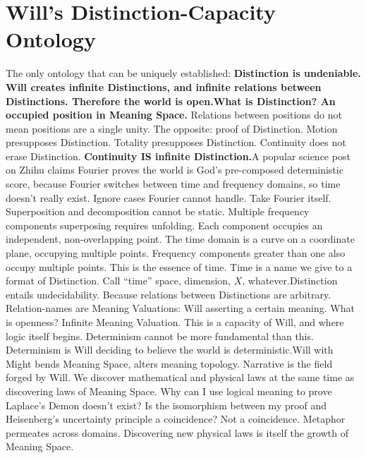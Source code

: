 \documentclass[11pt]{article}
\renewcommand{\\}[1][\mynewlineskip]{\oldnewline[#1]}
\begin{document}
\section{Will's Distinction-Capacity Ontology}
The only ontology that can be uniquely established:\textbf{ Distinction is undeniable. Will creates infinite Distinctions, and infinite relations between Distinctions. Therefore the world is open.}\\
\textbf{What is Distinction? An occupied position in Meaning Space.} Relations between positions do not mean positions are a single unity. The opposite: proof of Distinction. Motion presupposes Distinction. Totality presupposes Distinction. Continuity does not erase Distinction. \textbf{Continuity IS infinite Distinction.}\\
A popular science post on Zhihu claims Fourier proves the world is God's pre-composed deterministic score, because Fourier switches between time and frequency domains, so time doesn't really exist. Ignore cases Fourier cannot handle. Take Fourier itself. Superposition and decomposition cannot be static. Multiple frequency components superposing requires unfolding. Each component occupies an independent, non-overlapping point. The time domain is a curve on a coordinate plane, occupying multiple points. Frequency components greater than one also occupy multiple points. This is the essence of time. Time is a name we give to a format of Distinction. Call ``time'' space, dimension, $X$, whatever.\\
Distinction entails undecidability. Because relations between Distinctions are arbitrary. Relation-names are Meaning Valuations: Will asserting a certain meaning. What is openness? Infinite Meaning Valuation. This is a capacity of Will, and where logic itself begins. Determinism cannot be more fundamental than this. Determinism is Will deciding to believe the world is deterministic.\\
Will with Might bends Meaning Space, alters meaning topology. Narrative is the field forged by Will. We discover mathematical and physical laws at the same time as discovering laws of Meaning Space. Why can I use logical meaning to prove Laplace's Demon doesn't exist? Is the isomorphism between my proof and Heisenberg's uncertainty principle a coincidence? Not a coincidence. Metaphor permeates across domains. Discovering new physical laws is itself the growth of Meaning Space.
\end{document}
